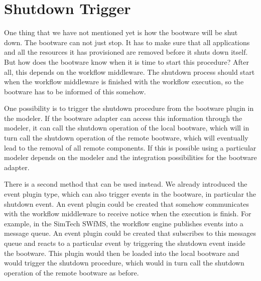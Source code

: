 \section{Shutdown Trigger}
\label{design:shutdown}

One thing that we have not mentioned yet is how the bootware will be shut down.
The bootware can not just stop.
It has to make sure that all applications and all the resources it has provisioned are removed before it shuts down itself.
But how does the bootware know when it is time to start this procedure?
After all, this depends on the workflow middleware.
The shutdown process should start when the workflow middleware is finished with the workflow execution, so the bootware has to be informed of this somehow.

One possibility is to trigger the shutdown procedure from the bootware plugin in the modeler.
If the bootware adapter can access this information through the modeler, it can call the shutdown operation of the local bootware, which will in turn call the shutdown operation of the remote bootware, which will eventually lead to the removal of all remote components.
If this is possible using a particular modeler depends on the modeler and the integration possibilities for the bootware adapter.

There is a second method that can be used instead.
We already introduced the event plugin type, which can also trigger events in the bootware, in particular the shutdown event.
An event plugin could be created that somehow communicates with the workflow middleware to receive notice when the execution is finish.
For example, in the SimTech SWfMS, the workflow engine publishes events into a message queue.
An event plugin could be created that subscribes to this messages queue and reacts to a particular event by triggering the shutdown event inside the bootware.
This plugin would then be loaded into the local bootware and would trigger the shutdown procedure, which would in turn call the shutdown operation of the remote bootware as before.
